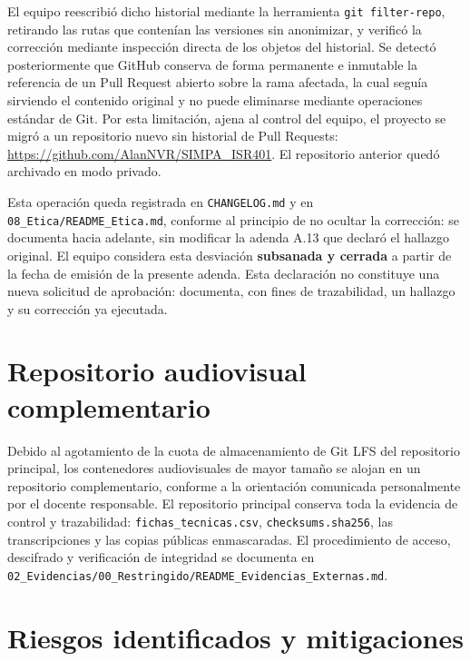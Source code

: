 \documentclass[11pt,a4paper]{article}
\begin{document}
El equipo reescribió dicho historial mediante la herramienta \texttt{git filter-repo}, retirando las rutas
que contenían las versiones sin anonimizar, y verificó la corrección mediante inspección directa de los
objetos del historial. Se detectó posteriormente que GitHub conserva de forma permanente e inmutable la
referencia de un Pull Request abierto sobre la rama afectada, la cual seguía sirviendo el contenido
original y no puede eliminarse mediante operaciones estándar de Git. Por esta limitación, ajena al control
del equipo, el proyecto se migró a un repositorio nuevo sin historial de Pull Requests:
\url{https://github.com/AlanNVR/SIMPA_ISR401}. El repositorio anterior quedó archivado en modo privado.

Esta operación queda registrada en \texttt{CHANGELOG.md} y en \texttt{08\_Etica/README\_Etica.md}, conforme
al principio de no ocultar la corrección: se documenta hacia adelante, sin modificar la adenda A.13 que
declaró el hallazgo original. El equipo considera esta desviación \textbf{subsanada y cerrada} a partir de
la fecha de emisión de la presente adenda. Esta declaración no constituye una nueva solicitud de
aprobación: documenta, con fines de trazabilidad, un hallazgo y su corrección ya ejecutada.

\section{Repositorio audiovisual complementario}

Debido al agotamiento de la cuota de almacenamiento de Git LFS del repositorio principal, los contenedores
audiovisuales de mayor tamaño se alojan en un repositorio complementario, conforme a la orientación
comunicada personalmente por el docente responsable. El repositorio principal conserva toda la evidencia
de control y trazabilidad: \texttt{fichas\_tecnicas.csv}, \texttt{checksums.sha256}, las transcripciones y
las copias públicas enmascaradas. El procedimiento de acceso, descifrado y verificación de integridad se
documenta en \texttt{02\_Evidencias/00\_Restringido/README\_Evidencias\_Externas.md}.

\section{Riesgos identificados y mitigaciones}
\end{document}
